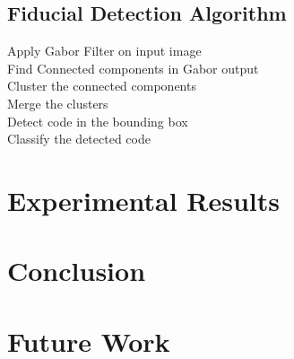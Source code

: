 \documentclass[runningheads]{llncs}
\begin{document}
\subsection{Fiducial Detection Algorithm}
Apply Gabor Filter on input image \\
Find Connected components in Gabor output \\
Cluster the connected components \\
Merge the clusters \\
Detect code in the bounding box \\
Classify the detected code 

\section{Experimental Results}

\section{Conclusion}

\section{Future Work}



\end{document}
